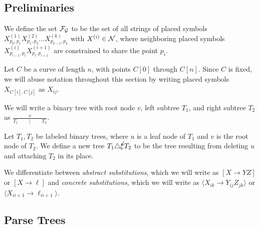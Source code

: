 \documentclass{article}
\begin{document}
\subsection{Preliminaries}

\begin{defn}
We define the set ${\mathcal F}_{{\mathcal G}}$ to be the set of all strings of placed
symbols $X^{(1)}_{p_0,p_1} X^{(2)}_{p_1,p_2} \dots X^{(k)}_{p_{k-1},
  p_k}$ with $X^{(i)} \in {\mathcal N}$, where neighboring placed symbols
$X^{(i)}_{p_{i-1},p_i} X^{(i+1)}_{p_i,p_{i+1}}$ are constrained to
share the point $p_i$.
\end{defn}

Let $C$ be a curve of length $n$, with points $C[0]$ through
$C[n]$. Since $C$ is fixed, we will abuse notation throughout this
section by writing placed symbols $X_{C[i],C[j]}$ as $X_{ij}$.

We will write a binary tree with root node $v$, left subtree $T_1$,
and right subtree $T_2$ as $\frac{v}{T_1\qquad \mid \qquad T_2}.$

\begin{defn}
  Let $T_1, T_2$ be labeled binary trees, where $u$ is a leaf node of
  $T_1$ and $v$ is the root node of $T_2$. We define a new tree $T_1
  \triangle^{\cancel{u}}_v T_2$ to be the tree resulting from deleting
  $u$ and attaching $T_2$ in its place.
\end{defn}

We differentiate between \emph{abstract substitutions}, which we will write
as $[X\to YZ]$ or $[X\to \ell]$ and \emph{concrete substitutions},
which we will write as $\langle X_{ik} \to Y_{ij} Z_{jk} \rangle$ or
$\langle X_{i i+1} \to \ell_{i i+1} \rangle$.

\subsection{Parse Trees}
\end{document}
